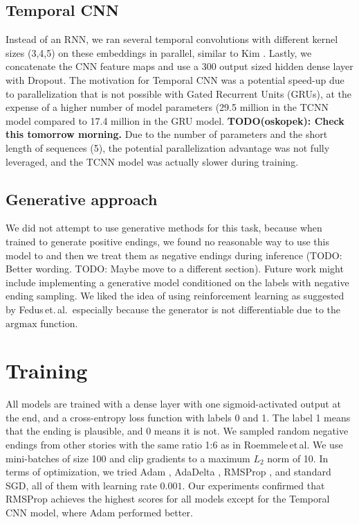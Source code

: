 \documentclass{article}
\begin{document}
\subsection{Temporal CNN}
Instead of an RNN, we ran several temporal convolutions with different kernel sizes (3,4,5) on these embeddings in parallel, similar to Kim \citep{Kim2014ConvolutionalClassification}. Lastly, we concatenate the CNN feature maps and use a 300 output sized hidden dense layer with Dropout. The motivation for Temporal CNN was a potential speed-up due to parallelization that is not possible with Gated Recurrent Units (GRUs), at the expense of a higher number of model parameters (29.5 million in the TCNN model compared to 17.4 million in the GRU model. \textbf{TODO(oskopek): Check this tomorrow morning.} Due to the number of parameters and the short length of sequences (5), the potential parallelization advantage was not fully leveraged, and the TCNN model was actually slower during training.

\subsection{Generative approach}
We did not attempt to use generative methods for this task, because when trained to generate positive endings, we found no reasonable way to use this model to  and then we treat them as negative endings during inference (TODO: Better wording. TODO: Maybe move to a different section). Future work might include implementing a generative model conditioned on the labels with negative ending sampling. We liked the idea of using reinforcement learning as suggested by Fedus\,et.\,al.\,\citep{Fedus2018MaskGAN:_______} especially because the generator is not differentiable due to the $\mathrm{argmax}$ function.


\section{Training}\label{sec:training}
All models are trained with a dense layer with one sigmoid-activated output at the end, and a cross-entropy loss function with labels 0 and 1. The label 1 means that the ending is plausible, and 0 means it is not. We sampled random negative endings from other stories with the same ratio 1:6 as in Roemmele\,et\,al. We use mini-batches of size 100 and clip gradients to a maximum $L_2$ norm of 10. In terms of optimization, we tried Adam \citep{Kingma2015}, AdaDelta \citep{Zeiler2012ADADELTA:Method}, RMSProp \citep{HintonNeuralDescent}, and standard SGD, all of them with learning rate $0.001$. Our experiments confirmed that RMSProp \citep{HintonNeuralDescent} achieves the highest scores for all models except for the Temporal CNN model, where Adam performed better.
\end{document}
